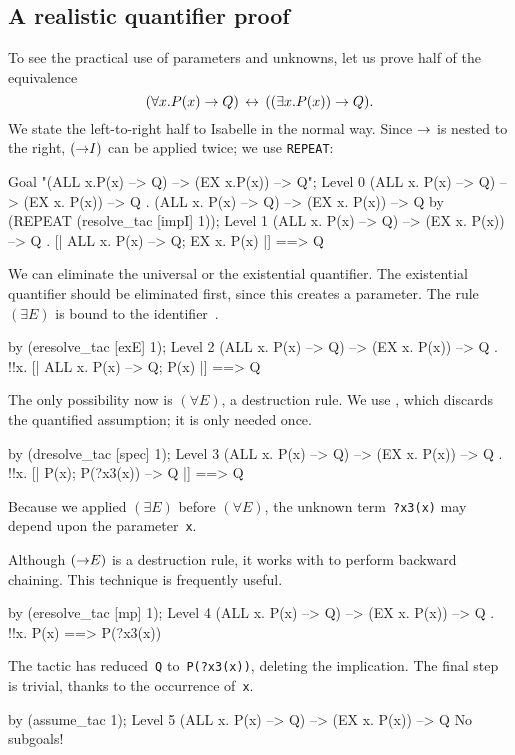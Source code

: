 \subsection{A realistic quantifier proof}
To see the practical use of parameters and unknowns, let us prove half of
the equivalence 
\[ (\forall x. P(x) \rightarrow Q) \,\leftrightarrow\, ((\exists x. P(x)) \rightarrow Q). \]
We state the left-to-right half to Isabelle in the normal way.
Since $\rightarrow$ is nested to the right, $({\rightarrow}I)$ can be applied twice; we
use \texttt{REPEAT}:
\begin{ttbox}
Goal "(ALL x.P(x) --> Q) --> (EX x.P(x)) --> Q";
{\out Level 0}
{\out (ALL x. P(x) --> Q) --> (EX x. P(x)) --> Q}
{. (ALL x. P(x) --> Q) --> (EX x. P(x)) --> Q}
\ttbreak
by (REPEAT (resolve_tac [impI] 1));
{\out Level 1}
{\out (ALL x. P(x) --> Q) --> (EX x. P(x)) --> Q}
{. [| ALL x. P(x) --> Q; EX x. P(x) |] ==> Q}
\end{ttbox}
We can eliminate the universal or the existential quantifier.  The
existential quantifier should be eliminated first, since this creates a
parameter.  The rule~$(\exists E)$ is bound to the
identifier~.
\begin{ttbox}
by (eresolve_tac [exE] 1);
{\out Level 2}
{\out (ALL x. P(x) --> Q) --> (EX x. P(x)) --> Q}
{. !!x. [| ALL x. P(x) --> Q; P(x) |] ==> Q}
\end{ttbox}
The only possibility now is $(\forall E)$, a destruction rule.  We use 
, which discards the quantified assumption; it is
only needed once.
\begin{ttbox}
by (dresolve_tac [spec] 1);
{\out Level 3}
{\out (ALL x. P(x) --> Q) --> (EX x. P(x)) --> Q}
{. !!x. [| P(x); P(?x3(x)) --> Q |] ==> Q}
\end{ttbox}
Because we applied $(\exists E)$ before $(\forall E)$, the unknown
term~{\tt?x3(x)} may depend upon the parameter~\texttt{x}.

Although $({\rightarrow}E)$ is a destruction rule, it works with 
 to perform backward chaining.  This technique is
frequently useful.  
\begin{ttbox}
by (eresolve_tac [mp] 1);
{\out Level 4}
{\out (ALL x. P(x) --> Q) --> (EX x. P(x)) --> Q}
{. !!x. P(x) ==> P(?x3(x))}
\end{ttbox}
The tactic has reduced~\texttt{Q} to~\texttt{P(?x3(x))}, deleting the
implication.  The final step is trivial, thanks to the occurrence of~\texttt{x}.
\begin{ttbox}
by (assume_tac 1);
{\out Level 5}
{\out (ALL x. P(x) --> Q) --> (EX x. P(x)) --> Q}
{\out No subgoals!}
\end{ttbox}


